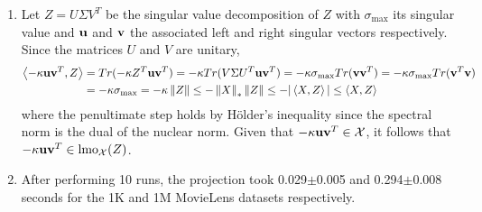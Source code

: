 \documentclass{article}
\begin{document}
\begin{enumerate}[label=(\alph*)]
    \item Let $Z=U\Sigma V^T$ be the singular value decomposition of $Z$ with $\sigma_{\max}$ its singular value and $\mathbf{u}$ and $\mathbf{v}$ the associated left and right singular vectors respectively. Since the matrices $U$ and $V$ are unitary,
    \begin{align}
         \left\langle -\kappa \mathbf{u}\mathbf{v}^T, Z \right\rangle &= Tr(-\kappa Z^T\mathbf{u}\mathbf{v}^T)= -\kappa Tr(V\Sigma U^T \mathbf{u}\mathbf{v}^T)= -\kappa \sigma_{\max} Tr(\mathbf{v} \mathbf{v}^T) = -\kappa  \sigma_{\max} Tr(\mathbf{v}^T \mathbf{v}) \\
         &= -\kappa \sigma_{\max} = -\kappa \left\lVert Z\right\rVert \leq -\left\lVert X\right\rVert_* \left\lVert Z\right\rVert \leq -|\left\langle X, Z \right\rangle|\leq \left\langle X, Z \right\rangle
         \label{eq:lmo}
    \end{align}
    where the penultimate step holds by Hölder's inequality since the spectral norm is the dual of the nuclear norm. Given that $-\kappa \mathbf{u}\mathbf{v}^T \in \mathcal{X}$, it follows that $-\kappa \mathbf{u}\mathbf{v}^T\in \text{lmo}_{\mathcal{X}}(Z)$.
    
    \item After performing 10 runs, the projection took 0.029$\pm$0.005 and 0.294$\pm$0.008 seconds for the 1K and 1M MovieLens datasets respectively.
\end{enumerate}
\end{document}
